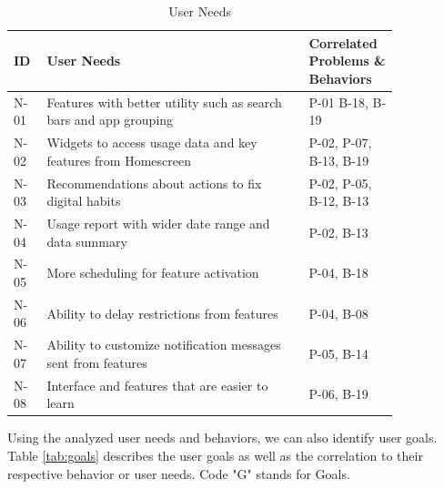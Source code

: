 \documentclass[conference]{IEEEtran}
\begin{document}
\RaggedLeft
\begin{table}[htbp]
  \caption{User Needs}
  \begin{footnotesize}
    \begin{center}
      \begin{tabular}{|m{0.07\linewidth}|m{0.6\linewidth}|m{0.17\linewidth}|}
        \hline
      \centering\textbf{ID} & \textbf{User Needs} & \textbf{Correlated Problems \& Behaviors}\\ \hline
      \centering N-01  & Features with better utility such as search bars and app grouping & P-01 B-18, B-19 \\ \hline
      \centering N-02  & Widgets to access usage data and key features from Homescreen & P-02, P-07, B-13, B-19 \\ \hline
      \centering N-03  & Recommendations about actions to fix digital habits & P-02, P-05, B-12, B-13 \\ \hline
      \centering N-04  & Usage report with wider date range and data summary & P-02, B-13 \\ \hline
      \centering N-05  & More scheduling for feature activation & P-04, B-18  \\ \hline
      \centering N-06  & Ability to delay restrictions from features & P-04, B-08 \\ \hline
      \centering N-07  & Ability to customize notification messages sent from features & P-05, B-14 \\ \hline
      \centering N-08  & Interface and features that are easier to learn & P-06, B-19 \\ \hline
    \end{tabular}
    \label{tab:needs}
  \end{center}
\end{footnotesize}
\end{table}
\justifying

Using the analyzed user needs and behaviors, we can also identify user goals. Table \ref{tab:goals} describes the user goals as well as the correlation to their respective behavior or user needs. Code "G" stands for Goals.
\end{document}
